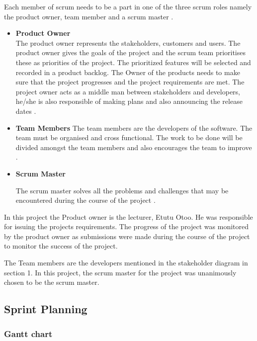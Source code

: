 \documentclass[10pt,onecolumn]{MainDocument}
\begin{document}
Each member of scrum needs to be a part in one of the three scrum roles namely the product owner, team member and a scrum master \cite{SoftwareEngineering}. 

\begin{itemize}
\item \textbf{Product Owner} \\
The product owner represents the stakeholders, customers and users. The product owner gives the goals of the project and the scrum team prioritises these as priorities of the project. The prioritized features will be selected and recorded in a product backlog. The Owner of the products needs to make sure that the project progresses and the project requirements are met. The project owner acts as a middle man between stakeholders and developers, he/she is also responsible of making plans and also announcing the release dates \cite{SoftwareEngineering}.    

\item \textbf{Team Members}
The team members are the developers of the software. The team must be organised and cross functional. The work to be done will be divided amongst the team members and also encourages the team to improve \cite{SoftwareEngineering}. 

    
\item \textbf{Scrum Master}

The scrum master solves all the problems and challenges that may be encountered during the course of the project \cite{SoftwareEngineering}. 
    
\end{itemize}  

In this project the Product owner is the lecturer, Etutu Otoo. He was responsible for issuing the projects requirements. The progress of the project was monitored by the product owner as submissions were made during the course of the project to monitor the success of the project.   

The Team members are the developers mentioned in the stakeholder diagram in section 1. In this project, the scrum master for the project was unanimously chosen to be the scrum master.  

\subsection{Sprint Planning } 

\subsubsection{Gantt chart}
   
\end{document}
